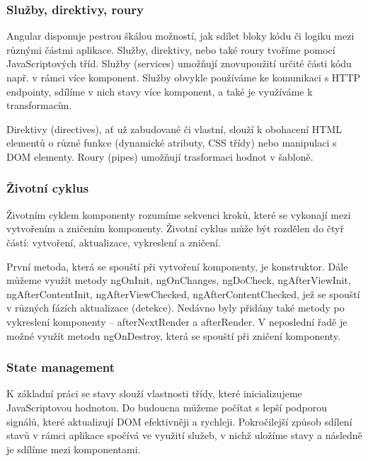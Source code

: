\subsubsection{Služby, direktivy, roury}

Angular disponuje pestrou škálou možností, jak sdílet bloky kódu či logiku mezi různými částmi aplikace. Služby, direktivy, nebo také roury tvoříme pomocí JavaScriptových tříd. 
Služby (services) umožňují znovupoužití určité části kódu např. v rámci více komponent. 
Služby obvykle používáme ke komunikaci s HTTP endpointy, sdílíme v nich stavy více komponent, a také je využíváme k transformacím.\cite{angulardev,learningangular}

Direktivy (directives), ať už zabudované či vlastní, slouží k obohacení HTML elementů o různé funkce (dynamické atributy, CSS třídy) nebo manipulaci s DOM elementy. 
Roury (pipes) umožňují trasformaci hodnot v šabloně.\cite{angulardev,angulario}

\subsubsection{Životní cyklus}

Životním cyklem komponenty rozumíme sekvenci kroků, které se vykonají mezi vytvořením a zničením komponenty. 
Životní cyklus může být rozdělen do čtyř částí: vytvoření, aktualizace, vykreslení a zničení. 

První metoda, která se spouští při vytvoření komponenty, je konstruktor. 
Dále můžeme využít metody ngOnInit, ngOnChanges, ngDoCheck, ngAfterViewInit, ngAfterContentInit, ngAfterViewChecked, ngAfterContentChecked, jež se spouští v různých fázích aktualizace (detekce). 
Nedávno byly přidány také metody po vykreslení komponenty -- afterNextRender a afterRender. V neposlední řadě je možné využít metodu ngOnDestroy, která se spouští při zničení komponenty.\cite{angulardev,learningangular} 

\subsubsection{State management}

K základní práci se stavy slouží vlastnosti třídy, které inicializujeme JavaScriptovou hodnotou. 
Do budoucna můžeme počítat s lepší podporou signálů, které aktualizují DOM efektivněji a rychleji. 
Pokročilejší způsob sdílení stavů v rámci aplikace spočívá ve využití služeb, v nichž uložíme stavy a následně je sdílíme mezi komponentami.\cite{angulardev}

